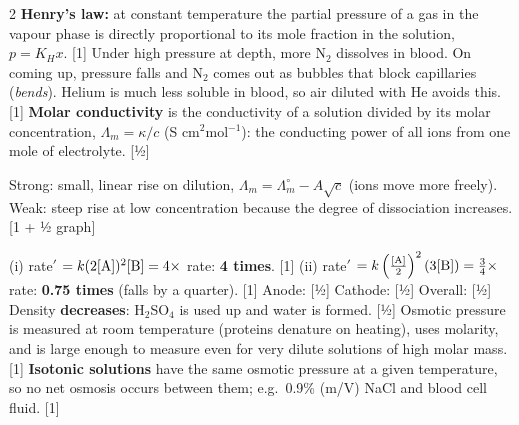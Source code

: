 \documentclass[10pt,a4paper]{extarticle}
\newcommand{\mk}[1]{{\scriptsize\color{black!55}[#1]}}
\begin{document}
\begin{multicols}{2}
\An \textbf{Henry's law:} at constant temperature the partial pressure of a gas in the vapour phase is directly proportional to its mole fraction in the solution, $p=K_Hx$. \mk{1}\nl
Under high pressure at depth, more N$_2$ dissolves in blood. On coming up, pressure falls and N$_2$ comes out as bubbles that block capillaries (\emph{bends}). Helium is much less soluble in blood, so air diluted with He avoids this. \mk{1}
\An \textbf{Molar conductivity} is the conductivity of a solution divided by its molar concentration, $\Lambda_m=\kappa/c$ (S cm$^2$mol$^{-1}$): the conducting power of all ions from one mole of electrolyte. \mk{½}\nl
\begin{minipage}[c]{0.36\linewidth}
\end{minipage}\hfill
\begin{minipage}[c]{0.6\linewidth}
Strong: small, linear rise on dilution, $\Lambda_m=\Lambda_m^\circ-A\sqrt c$ (ions move more freely). Weak: steep rise at low concentration because the degree of dissociation increases. \mk{1 + ½ graph}
\end{minipage}
\An (i) rate$'$ $=k(2[\ce A])^2[\ce B]=4\times$ rate: \textbf{4 times}. \mk{1}\nl
(ii) rate$'$ $=k\left(\tfrac{[\ce A]}{2}\right)^2(3[\ce B])=\tfrac34\times$ rate: \textbf{0.75 times} (falls by a quarter). \mk{1}
\An Anode:  \mk{½}\nl
Cathode:  \mk{½}\nl
Overall:  \mk{½}\nl
Density \textbf{decreases}: H$_2$SO$_4$ is used up and water is formed. \mk{½}
\An Osmotic pressure is measured at room temperature (proteins denature on heating), uses molarity, and is large enough to measure even for very dilute solutions of high molar mass. \mk{1}\nl
\textbf{Isotonic solutions} have the same osmotic pressure at a given temperature, so no net osmosis occurs between them; e.g.\ 0.9\% (m/V) NaCl and blood cell fluid. \mk{1}


\end{multicols}
\end{document}
